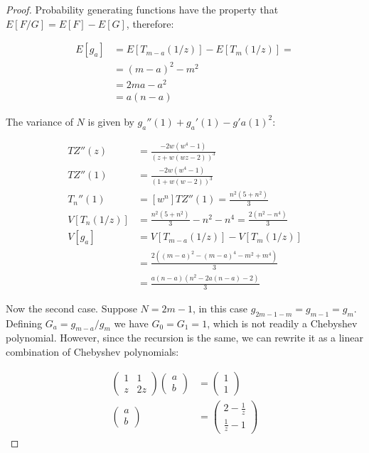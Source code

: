 \documentclass[10pt]{book}
\begin{document}
\begin{proof}
Probability generating functions have the property that $E[F/G]=E[F]-E[G]$, therefore:

\begin{align*}
  E[g_a] &= E[T_{m-a}(1/z)] - E[T_m(1/z)] = \\
    &= (m-a)^2 - m^2 \\
    &= 2ma - a^2 \\
    &= a(n-a)
\end{align*}

The variance of $N$ is given by $g_a''(1)+g_a'(1)-g'a(1)^2$:

\begin{align*}
  TZ''(z) &= \frac{-2w(w^4-1)}{(z+w(wz-2))^3} \\
  TZ''(1) &= \frac{-2w(w^4-1)}{(1+w(w-2))^3} \\
  T_n''(1) &= [w^n]TZ''(1) = \frac{n^2(5+n^2)}{3} \\
  V[T_n(1/z)] &= \frac{n^2(5+n^2)}{3}-n^2-n^4=\frac{2(n^2-n^4)}{3}\\
  V[g_a] &= V[T_{m-a}(1/z)]-V[T_m(1/z)] \\
         &= \frac{2((m-a)^2-(m-a)^4-m^2+m^4)}{3} \\
         &= \frac{a(n-a)(n^2-2a(n-a)-2)}{3}
\end{align*}

Now the second case. Suppose $N=2m-1$, in this case $g_{2m-1-m}=g_{m-1}=g_m$. Defining $G_a=g_{m-a}/g_m$ we have $G_0=G_1=1$, which is not readily a Chebyshev polynomial. However, since the recursion is the same, we can rewrite it as a linear combination of Chebyshev polynomials:

\begin{align*}
\begin{pmatrix} 1 & 1 \\ z & 2z\end{pmatrix}
\begin{pmatrix}a \\ b\end{pmatrix}
  &=
\begin{pmatrix}1 \\ 1\end{pmatrix} \\
\begin{pmatrix}a \\ b\end{pmatrix}
  &=
\begin{pmatrix} 2-\frac{1}{z} \\ \frac{1}{z} -1\end{pmatrix}
\end{align*}


\end{proof}
\end{document}
